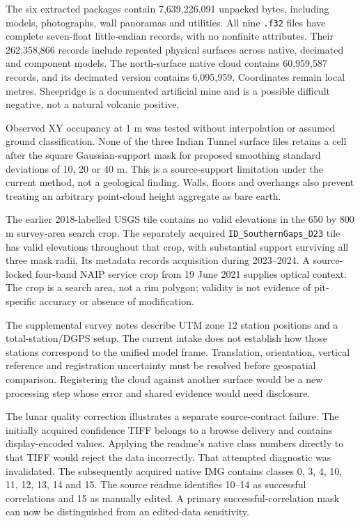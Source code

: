 \documentclass{article}
\begin{document}
The six extracted packages contain 7,639,226,091 unpacked bytes, including models, photographs, wall panoramas and utilities. All nine \texttt{.f32} files have complete seven-float little-endian records, with no nonfinite attributes. Their 262,358,866 records include repeated physical surfaces across native, decimated and component models. The north-surface native cloud contains 60,959,587 records, and its decimated version contains 6,095,959. Coordinates remain local metres. Sheepridge is a documented artificial mine and is a possible difficult negative, not a natural volcanic positive.

Observed XY occupancy at 1 m was tested without interpolation or assumed ground classification. None of the three Indian Tunnel surface files retains a cell after the square Gaussian-support mask for proposed smoothing standard deviations of 10, 20 or 40 m. This is a source-support limitation under the current method, not a geological finding. Walls, floors and overhangs also prevent treating an arbitrary point-cloud height aggregate as bare earth.

The earlier 2018-labelled USGS tile contains no valid elevations in the 650 by 800 m survey-area search crop. The separately acquired \texttt{ID\_SouthernGaps\_D23} tile has valid elevations throughout that crop, with substantial support surviving all three mask radii. Its metadata records acquisition during 2023--2024. A source-locked four-band NAIP service crop from 19 June 2021 supplies optical context. The crop is a search area, not a rim polygon; validity is not evidence of pit-specific accuracy or absence of modification.

The supplemental survey notes describe UTM zone 12 station positions and a total-station/DGPS setup. The current intake does not establish how those stations correspond to the unified model frame. Translation, orientation, vertical reference and registration uncertainty must be resolved before geospatial comparison. Registering the cloud against another surface would be a new processing step whose error and shared evidence would need disclosure.

The lunar quality correction illustrates a separate source-contract failure. The initially acquired confidence TIFF belongs to a browse delivery and contains display-encoded values. Applying the readme's native class numbers directly to that TIFF would reject the data incorrectly. That attempted diagnostic was invalidated. The subsequently acquired native IMG contains classes 0, 3, 4, 10, 11, 12, 13, 14 and 15. The source readme identifies 10--14 as successful correlations and 15 as manually edited. A primary successful-correlation mask can now be distinguished from an edited-data sensitivity.
\end{document}
